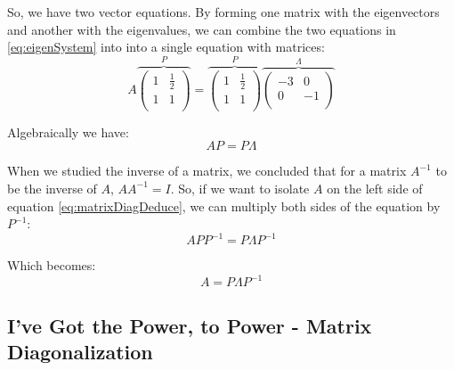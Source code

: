 \documentclass[a4,12pt,twosided,openany]{memoir}
\begin{document}
\par 
\indent
So, we have two vector equations. By forming one matrix with the eigenvectors and another with the eigenvalues, we can combine the two equations in \ref{eq:eigenSystem} into into a single equation with matrices:
\[A \overbrace{\begin{pmatrix}
1 & \frac{1}{2} \\
1 & 1 \\
\end{pmatrix}}^P  =  \overbrace{\begin{pmatrix}
1 & \frac{1}{2} \\
1 & 1 \\
\end{pmatrix}}^P \overbrace{\begin{pmatrix}
-3 & 0 \\
0 & -1 \\
\end{pmatrix}}^\Lambda
\]
\par 
\indent
Algebraically we have:
\begin{equation}
AP=P\Lambda \label{eq:matrixDiagDeduce}
\end{equation}
\par 
\indent
When we studied the inverse of a matrix, we concluded that for a matrix $A^{-1}$ to be the inverse of $A$, $AA^{-1} = I$. So, if we want to isolate $A$ on the left side of equation \ref{eq:matrixDiagDeduce}, we can multiply both sides of the equation by $P^{-1}$:
\[
APP^{-1} = P \Lambda P^{-1}
\]
\par 
\indent
Which becomes:
\begin{equation}\label{eq:matrixDiag}
A = P \Lambda P^{-1} 
\end{equation}
\subsection{I’ve Got the Power, to Power - Matrix Diagonalization}
\par 
\indent
\end{document}
